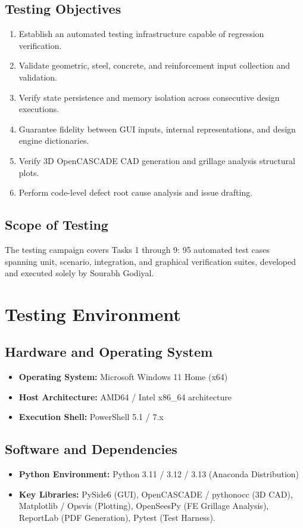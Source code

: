 \documentclass[11pt,a4paper]{report}
\begin{document}
\section{Testing Objectives}
\begin{enumerate}
    \item Establish an automated testing infrastructure capable of regression verification.
    \item Validate geometric, steel, concrete, and reinforcement input collection and validation.
    \item Verify state persistence and memory isolation across consecutive design executions.
    \item Guarantee fidelity between GUI inputs, internal representations, and design engine dictionaries.
    \item Verify 3D OpenCASCADE CAD generation and grillage analysis structural plots.
    \item Perform code-level defect root cause analysis and issue drafting.
\end{enumerate}

\section{Scope of Testing}
The testing campaign covers Tasks 1 through 9: 95 automated test cases spanning unit, scenario, integration, and graphical verification suites, developed and executed solely by Sourabh Godiyal.

\chapter{Testing Environment}
\section{Hardware and Operating System}
\begin{itemize}
    \item \textbf{Operating System:} Microsoft Windows 11 Home (x64)
    \item \textbf{Host Architecture:} AMD64 / Intel x86\_64 architecture
    \item \textbf{Execution Shell:} PowerShell 5.1 / 7.x
\end{itemize}

\section{Software and Dependencies}
\begin{itemize}
    \item \textbf{Python Environment:} Python 3.11 / 3.12 / 3.13 (Anaconda Distribution)
    \item \textbf{Key Libraries:} PySide6 (GUI), OpenCASCADE / pythonocc (3D CAD), Matplotlib / Opsvis (Plotting), OpenSeesPy (FE Grillage Analysis), ReportLab (PDF Generation), Pytest (Test Harness).
\end{itemize}
\end{document}
